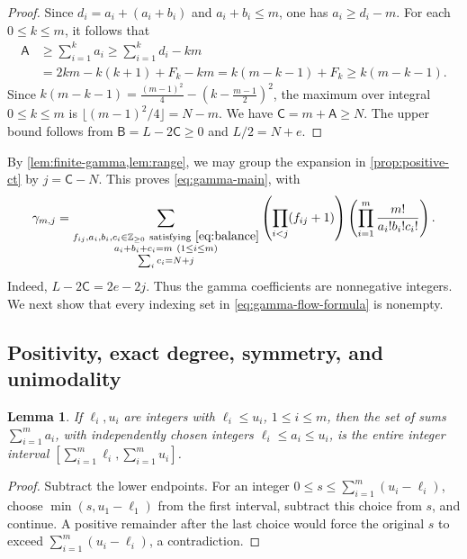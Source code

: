 \documentclass[reqno, 12pt]{article}
\numberwithin{equation}{section}
\newtheorem{lemma}[theorem]{Lemma}
\theoremstyle{definition}
\newcommand{\NN}{\mathbb Z_{\geq0}}
\begin{document}
\begin{proof}
Since $d_i=a_i+(a_i+b_i)$ and $a_i+b_i\leq m$, one has
$a_i\geq d_i-m$.  For each $0\leq k\leq m$, it follows that
\begin{align*}
\mathsf A
&\geq\sum_{i=1}^k a_i
\geq\sum_{i=1}^k d_i-km\\
&=2km-k(k+1)+F_k-km
=k(m-k-1)+F_k
\geq k(m-k-1).
\end{align*}
Since $k(m-k-1)=\frac{(m-1)^2}{4}-\left(k-\frac{m-1}{2}\right)^2$, the maximum over integral $0\leq k\leq m$ is
$\lfloor(m-1)^2/4\rfloor=N-m$. We have $\mathsf C=m+\mathsf A\geq N$.  The upper bound follows
from $\mathsf B=L-2\mathsf C\geq0$ and $L/2=N+e$.
\end{proof}

By \cref{lem:finite-gamma,lem:range}, we may
group the expansion in \cref{prop:positive-ct} by
$j=\mathsf C-N$.  This proves \eqref{eq:gamma-main}, with
\begin{equation}\label{eq:gamma-flow-formula}
\gamma_{m,j}=\sum_{\substack{f_{ij},a_i,b_i,c_i\in\NN\ \text{satisfying}\ \eqref{eq:balance}\\
                  a_i+b_i+c_i=m\ (1\leq i\leq m)\\
                  \sum_i c_i=N+j}}
\left(\prod_{i<j}(f_{ij}+1)\right)\left(\prod_{i=1}^m\frac{m!}{a_i!b_i!c_i!}\right).
\end{equation}
Indeed, $L-2\mathsf C=2e-2j$.  Thus the gamma coefficients
are nonnegative integers.  We next show that every indexing set
in \eqref{eq:gamma-flow-formula} is nonempty.


\subsection{Positivity, exact degree, symmetry, and unimodality}

\begin{lemma}\label{lem:integer-intervals}
If $\ell_i,u_i$ are integers with $\ell_i\leq u_i$, $1\leq i\leq m$, then the
set of sums $\sum_{i=1}^m a_i$, with independently chosen integers $\ell_i\leq a_i\leq u_i$, is the entire integer interval
$[\sum_{i=1}^m \ell_i,\sum_{i=1}^m u_i]$.
\end{lemma}
\begin{proof}
Subtract the lower endpoints.  For an integer $0\leq s\leq\sum_{i=1}^m(u_i-\ell_i)$, choose
$\min(s,u_1-\ell_1)$ from the first interval, subtract this choice from $s$, and continue.  A positive remainder after the
last choice would force the original $s$ to exceed $\sum_{i=1}^m(u_i-\ell_i)$, a contradiction.
\end{proof}
\end{document}
